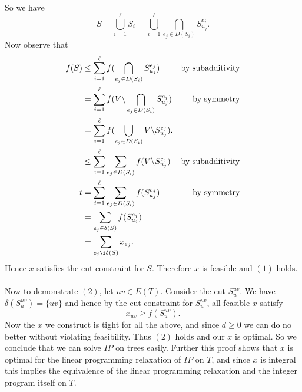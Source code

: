 \documentclass[letterpaper,12pt,oneside,onecolumn]{article}
\begin{document}
\paragraph{}
So we have $$S = \bigcup_{i=1}^\ell S_i = \bigcup_{i=1}^\ell \bigcap_{e_j \in D(S_i)}S^{e_j}_{u_j}.$$ Now observe that
\begin{align*}
f(S) &\leq \sum_{i=1}^\ell f(\bigcap_{e_j \in D(S_i)}S^{e_j}_{u_j}) &\text{by subadditivity} \\
&= \sum_{i=1}^\ell f(V\backslash \bigcap_{e_j \in D(S_i)} S^{e_j}_{u_j}) &\text{by symmetry} \\
&= \sum_{i=1}^\ell f(\bigcup_{e_j\in D(S_i)} V\backslash S^{e_j}_{u_j}). \\
&\leq \sum_{i=1}^\ell \sum_{e_j \in D(S_i)} f(V\backslash S^{e_j}_{u_j}) &\text{by subadditivity} \\ t
&= \sum_{i=1}^\ell \sum_{e_j \in D(S_i)} f(S^{e_j}_{u_j}) &\text{by symmetry} \\
&= \sum_{e_j \in \delta(S)} f(S^{e_j}_{u_j}) \\
&= \sum_{e_j \i \delta(S)} x_{e_j}.
\end{align*}
Hence $x$ satisfies the cut constraint for $S$. Therefore $x$ is feasible and $(1)$ holds.
\paragraph{}
Now to demonstrate $(2)$, let $uv \in E(T)$. Consider the cut $S^{uv}_u$. We have $\delta(S^{uv}_u) = \{uv\}$ and hence by the cut constraint for $S^{uv}_u$, all feasible $x$ satisfy
$$x_{uv} \geq f(S^{uv}_u).$$
Now the $x$ we construct is tight for all the above, and since $d \geq 0$ we can do no better without violating feasibility. Thus $(2)$ holds and our $x$ is optimal. So we conclude that we can solve $IP$ on trees easily. Further this proof shows that $x$ is optimal for the linear programming relaxation of $IP$ on $T$, and since $x$ is integral this implies the equivalence of the linear programming relaxation and the integer program itself on $T$.
\end{document}
